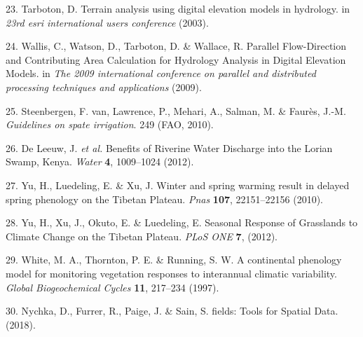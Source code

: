 \documentclass[12pt,oneside]{article}
\begin{document}
\leavevmode\hypertarget{ref-Tarboton_2003}{}%
23. Tarboton, D. Terrain analysis using digital elevation models in hydrology. in \emph{23rd esri international users conference} (2003).

\leavevmode\hypertarget{ref-Wallis_et_al_2009}{}%
24. Wallis, C., Watson, D., Tarboton, D. \& Wallace, R. Parallel Flow-Direction and Contributing Area Calculation for Hydrology Analysis in Digital Elevation Models. in \emph{The 2009 international conference on parallel and distributed processing techniques and applications} (2009).

\leavevmode\hypertarget{ref-VanSteenbergen_et_al_2010}{}%
25. Steenbergen, F. van, Lawrence, P., Mehari, A., Salman, M. \& Faurès, J.-M. \emph{Guidelines on spate irrigation}. 249 (FAO, 2010).

\leavevmode\hypertarget{ref-DeLeeuw_et_al_2012}{}%
26. De Leeuw, J. \emph{et al.} Benefits of Riverine Water Discharge into the Lorian Swamp, Kenya. \emph{Water} \textbf{4}, 1009--1024 (2012).

\leavevmode\hypertarget{ref-Yu_et_al_2010}{}%
27. Yu, H., Luedeling, E. \& Xu, J. Winter and spring warming result in delayed spring phenology on the Tibetan Plateau. \emph{Pnas} \textbf{107}, 22151--22156 (2010).

\leavevmode\hypertarget{ref-Yu_et_al_2012}{}%
28. Yu, H., Xu, J., Okuto, E. \& Luedeling, E. Seasonal Response of Grasslands to Climate Change on the Tibetan Plateau. \emph{PLoS ONE} \textbf{7}, (2012).

\leavevmode\hypertarget{ref-White_et_al_1997}{}%
29. White, M. A., Thornton, P. E. \& Running, S. W. A continental phenology model for monitoring vegetation responses to interannual climatic variability. \emph{Global Biogeochemical Cycles} \textbf{11}, 217--234 (1997).

\leavevmode\hypertarget{ref-Nychka_et_al_2018}{}%
30. Nychka, D., Furrer, R., Paige, J. \& Sain, S. fields: Tools for Spatial Data. (2018).
\end{document}

